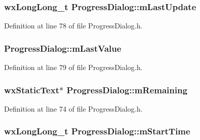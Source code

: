 \subsubsection[{\texorpdfstring{m\+Last\+Update}{mLastUpdate}}]{\setlength{\rightskip}{0pt plus 5cm}wx\+Long\+Long\+\_\+t Progress\+Dialog\+::m\+Last\+Update\hspace{0.3cm}{\ttfamily [protected]}}\hypertarget{class_progress_dialog_a6f0d4ff7c012a3356642d5e818c99eb5}{}\label{class_progress_dialog_a6f0d4ff7c012a3356642d5e818c99eb5}


Definition at line 78 of file Progress\+Dialog.\+h.

\subsubsection[{\texorpdfstring{m\+Last\+Value}{mLastValue}}]{ Progress\+Dialog\+::m\+Last\+Value\hspace{0.3cm}{\ttfamily [protected]}}\hypertarget{class_progress_dialog_a42313289469eb4bdb7877c51eb4cb6a0}{}\label{class_progress_dialog_a42313289469eb4bdb7877c51eb4cb6a0}


Definition at line 79 of file Progress\+Dialog.\+h.

\subsubsection[{\texorpdfstring{m\+Remaining}{mRemaining}}]{\setlength{\rightskip}{0pt plus 5cm}wx\+Static\+Text$\ast$ Progress\+Dialog\+::m\+Remaining\hspace{0.3cm}{\ttfamily [protected]}}\hypertarget{class_progress_dialog_a424c37177a055e7f3e22bf0e2cd9c2c9}{}\label{class_progress_dialog_a424c37177a055e7f3e22bf0e2cd9c2c9}


Definition at line 74 of file Progress\+Dialog.\+h.

\subsubsection[{\texorpdfstring{m\+Start\+Time}{mStartTime}}]{\setlength{\rightskip}{0pt plus 5cm}wx\+Long\+Long\+\_\+t Progress\+Dialog\+::m\+Start\+Time\hspace{0.3cm}{\ttfamily [protected]}}\hypertarget{class_progress_dialog_a666a2fcdf5f58018bd89baf8ef4005b5}{}\label{class_progress_dialog_a666a2fcdf5f58018bd89baf8ef4005b5}


